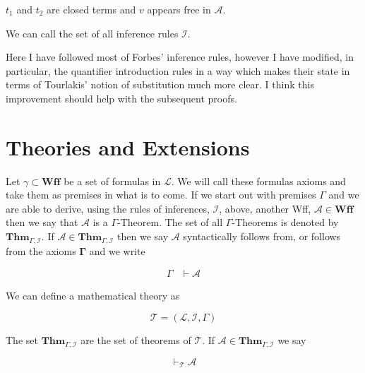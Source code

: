 \documentclass[12pt]{article}
\newcommand{\bv}[1]{\boldsymbol{#1}}
\newcommand{\mc}[1]{\mathcal{#1}}
\newcommand{\bc}[1]{\bv{\mc{#1}}}
\begin{document}
\hrulefill
\begin{ND}[Rule of $=E$][][][][.6\linewidth]
\ndljg{Y}{(k)}{$\mc{A}[v\leftarrow t_1]$}{}
\ndljg{X\cup Y}{(l)}{$\mc{A}[v \leftarrow t_2]$}{$j,k,=E$}
\end{ND}
$t_1$ and $t_2$ are closed terms and $v$ appears free in $\mc{A}$.

\hrulefill

We can call the set of all inference rules $\bc{I}$.

Here I have followed most of Forbes' inference rules, however I have modified, in particular, the quantifier introduction rules in a way which makes their state in terms of Tourlakis' notion of substitution much more clear. I think this improvement should help with the subsequent proofs.

\section*{Theories and Extensions}

Let $\gamma \subset \mathbf{Wff}$ be a set of formulas in $\mc{L}$. We will call these formulas axioms and take them as premises in what is to come. If we start out with premises $\Gamma$ and we are able to derive, using the rules of inferences, $\bc{I}$, above, another Wff, $\mc{A}\in\textbf{Wff}$ then we say that $\mc{A}$ is a $\Gamma$-Theorem. The set of all $\Gamma$-Theorems is denoted by $\mathbf{Thm}_{\Gamma,\bc{I}}$. If $\mc{A} \in \mathbf{Thm}_{\Gamma,\bc{I}}$ then we say $\mc{A}$ syntactically follows from, or follows from the axioms $\bv{\Gamma}$ and we write

\begin{equation}
\begin{split}
\Gamma &\vdash \mc{A}
\end{split}
\end{equation}


We can define a mathematical theory as

\begin{equation}
\bc{T} = (\bv{\mc{L}}, \bc{I}, \Gamma)
\end{equation}

The set $\mathbf{Thm}_{\Gamma,\bc{I}}$ are the set of theorems of $\bc{T}$. If $\mc{A} \in \textbf{Thm}_{\Gamma,\bc{I}}$ we say

\begin{equation}
\vdash_{\bc{T}} \mc{A}
\end{equation}
\end{document}
